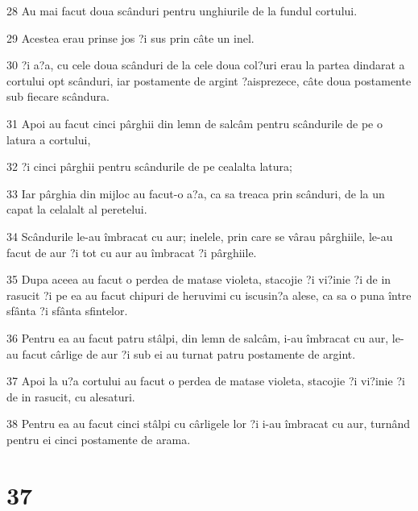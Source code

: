 \par 28 Au mai facut doua scânduri pentru unghiurile de la fundul cortului.
\par 29 Acestea erau prinse jos ?i sus prin câte un inel.
\par 30 ?i a?a, cu cele doua scânduri de la cele doua col?uri erau la partea dindarat a cortului opt scânduri, iar postamente de argint ?aisprezece, câte doua postamente sub fiecare scândura.
\par 31 Apoi au facut cinci pârghii din lemn de salcâm pentru scândurile de pe o latura a cortului,
\par 32 ?i cinci pârghii pentru scândurile de pe cealalta latura;
\par 33 Iar pârghia din mijloc au facut-o a?a, ca sa treaca prin scânduri, de la un capat la celalalt al peretelui.
\par 34 Scândurile le-au îmbracat cu aur; inelele, prin care se vârau pârghiile, le-au facut de aur ?i tot cu aur au îmbracat ?i pârghiile.
\par 35 Dupa aceea au facut o perdea de matase violeta, stacojie ?i vi?inie ?i de in rasucit ?i pe ea au facut chipuri de heruvimi cu iscusin?a alese, ca sa o puna între sfânta ?i sfânta sfintelor.
\par 36 Pentru ea au facut patru stâlpi, din lemn de salcâm, i-au îmbracat cu aur, le-au facut cârlige de aur ?i sub ei au turnat patru postamente de argint.
\par 37 Apoi la u?a cortului au facut o perdea de matase violeta, stacojie ?i vi?inie ?i de in rasucit, cu alesaturi.
\par 38 Pentru ea au facut cinci stâlpi cu cârligele lor ?i i-au îmbracat cu aur, turnând pentru ei cinci postamente de arama.

\chapter{37}

